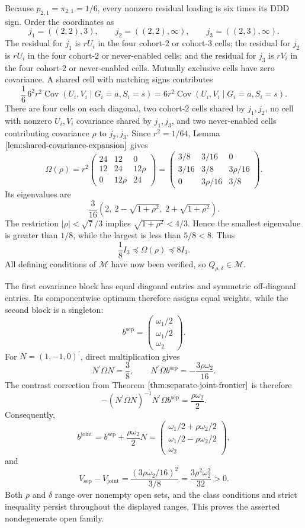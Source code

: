 Because \(p_{2,1}=\pi_{2,1}=1/6\), every nonzero residual loading is six times its DDD sign.  Order the coordinates as
\[
 j_1=((2,2),3),\qquad
 j_2=((2,2),\infty),\qquad
 j_3=((2,3),\infty).
\]
The residual for \(j_1\) is \(rU_i\) in the four cohort-\(2\) or cohort-\(3\) cells; the residual for \(j_2\) is \(rU_i\) in the four cohort-\(2\) or never-enabled cells; and the residual for \(j_3\) is \(rV_i\) in the four cohort-\(2\) or never-enabled cells.  Mutually exclusive cells have zero covariance.  A shared cell with matching signs contributes
\[
 \frac16\,6^2r^2\operatorname{Cov}(U_i,V_i\mid G_i=a,S_i=s)
 =6r^2\operatorname{Cov}(U_i,V_i\mid G_i=a,S_i=s).
\]
There are four cells on each diagonal, two cohort-\(2\) cells shared by \(j_1,j_2\), no cell with nonzero \(U_i,V_i\) covariance shared by \(j_1,j_3\), and two never-enabled cells contributing covariance \(\rho\) to \(j_2,j_3\).  Since \(r^2=1/64\), Lemma \(\ref{lem:shared-covariance-expansion}\) gives
\[
 \Omega(\rho)=r^2
 \begin{pmatrix}
 24&12&0\\
 12&24&12\rho\\
 0&12\rho&24
 \end{pmatrix}
 =
 \begin{pmatrix}
 3/8&3/16&0\\
 3/16&3/8&3\rho/16\\
 0&3\rho/16&3/8
 \end{pmatrix}.
\]
Its eigenvalues are
\[
 \frac3{16}\left(2,\ 2-\sqrt{1+\rho^2},\ 2+\sqrt{1+\rho^2}\right).
\]
The restriction \(|\rho|<\sqrt7/3\) implies \(\sqrt{1+\rho^2}<4/3\).  Hence the smallest eigenvalue is greater than \(1/8\), while the largest is less than \(5/8<8\).  Thus
\[
 \frac18I_3\preceq\Omega(\rho)\preceq8I_3.
\]
All defining conditions of \(\mathcal M\) have now been verified, so \(Q_{\rho,\delta}\in\mathcal M\).

The first covariance block has equal diagonal entries and symmetric off-diagonal entries.  Its componentwise optimum therefore assigns equal weights, while the second block is a singleton:
\[
 b^{\mathrm{sep}}=
 \begin{pmatrix}\omega_1/2\\ \omega_1/2\\ \omega_2\end{pmatrix}.
\]
For \(N=(1,-1,0)^{\prime}\), direct multiplication gives
\[
 N^{\prime}\Omega N=\frac38,
 \qquad
 N^{\prime}\Omega b^{\mathrm{sep}}=-\frac{3\rho\omega_2}{16}.
\]
The contrast correction from Theorem \(\ref{thm:separate-joint-frontier}\) is therefore
\[
 -(N^{\prime}\Omega N)^{-1}N^{\prime}\Omega b^{\mathrm{sep}}
 =\frac{\rho\omega_2}{2}.
\]
Consequently,
\[
 b^{\mathrm{joint}}
 =b^{\mathrm{sep}}+\frac{\rho\omega_2}{2}N
 =\begin{pmatrix}
 \omega_1/2+\rho\omega_2/2\\
 \omega_1/2-\rho\omega_2/2\\
 \omega_2
 \end{pmatrix},
\]
and
\[
 V_{\mathrm{sep}}-V_{\mathrm{joint}}
 =\frac{(3\rho\omega_2/16)^2}{3/8}
 =\frac{3\rho^2\omega_2^2}{32}>0.
\]
Both \(\rho\) and \(\delta\) range over nonempty open sets, and the class conditions and strict inequality persist throughout the displayed ranges.  This proves the asserted nondegenerate open family.